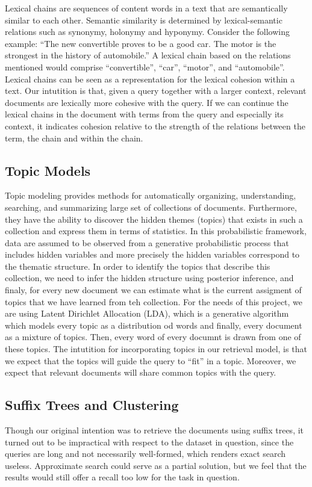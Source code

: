 \documentclass[11pt, a4paper, abstraction]{scrartcl}
\begin{document}
Lexical chains are sequences of content words in a text that are semantically similar to each other. Semantic similarity is determined by lexical-semantic relations such as synonymy, holonymy and hyponymy. Consider the following example: ``The new convertible proves to be a good car. The motor is the strongest in the history of automobile.''
A lexical chain based on the relations mentioned would comprise ``convertible'', ``car'', ``motor'', and ``automobile''. Lexical chains can be seen as a representation for the lexical cohesion within a text. Our intutition is that, given a query together with a larger context, relevant documents are lexically more cohesive with the query. If we can continue the lexical chains in the document with terms from the query and especially its context, it indicates cohesion relative to the strength of the relations between the term, the chain and within the chain.
  
\subsection{Topic Models}
Topic modeling provides methods for automatically organizing, understanding, searching, and summarizing large set of collections of documents. Furthermore, they have the ability to discover the hidden themes (topics) that exists in such a collection and express them in terms of statistics. In this probabilistic framework, data are assumed to be observed from a generative probabilistic process that includes hidden variables and more precisely the hidden variables correspond to the thematic structure. In order to identify the topics that describe this collection, we need to infer the hidden structure using posterior inference, and finaly, for every new document we can estimate what is the current assigment of topics that we have learned from teh collection. 
For the needs of this project, we are using Latent Dirichlet Allocation (LDA), which is a generative algorithm which models every topic as a distribution od words and finally, every document as a mixture of topics. Then, every word of every documnt is drawn from one of these topics. 
The intutition for incorporating topics in our retrieval model, is that we expect that the topics will guide the query to ``fit'' in a topic. Moreover, we expect that relevant documents will share common topics with the query.

\subsection{Suffix Trees and Clustering}
Though our original intention was to retrieve the documents using suffix trees, it turned out to be impractical with respect to the dataset in question, since the queries are long and not necessarily well-formed, which renders exact search useless. Approximate search could serve as a partial solution, but we feel that the results would still offer a recall too low for the task in question.
\end{document}
